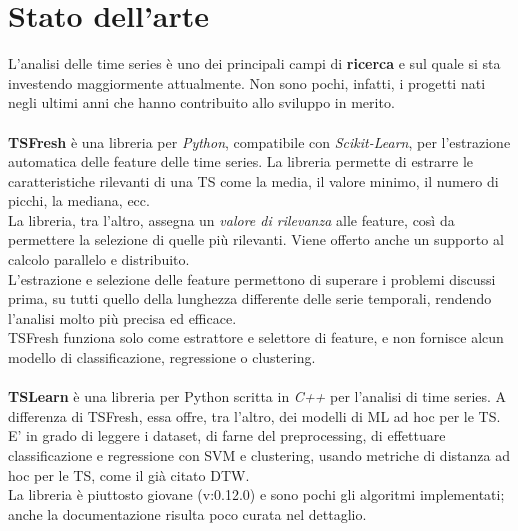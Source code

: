 \section{Stato dell'arte}
L'analisi delle time series è uno dei principali campi di \textbf{ricerca} e sul quale si sta investendo maggiormente attualmente. Non sono pochi, infatti, i progetti nati negli ultimi anni che hanno contribuito allo sviluppo in merito.\\
\\
\textbf{TSFresh}\cite{tsfresh} è una libreria per \textit{Python}, compatibile con \textit{Scikit-Learn}, per l'estrazione automatica delle feature delle time series. La libreria permette di estrarre le caratteristiche rilevanti di una TS come la media, il valore minimo, il numero di picchi, la mediana, ecc.\\
La libreria, tra l'altro, assegna un \textit{valore di rilevanza} alle feature, così da permettere la selezione di quelle più rilevanti. Viene offerto anche un supporto al calcolo parallelo e distribuito.\\
L'estrazione e selezione delle feature permettono di superare i problemi discussi prima, su tutti quello della lunghezza differente delle serie temporali, rendendo l'analisi molto più precisa ed efficace.\\
TSFresh funziona solo come estrattore e selettore di feature, e non fornisce alcun modello di classificazione, regressione o clustering.\\
\\
\textbf{TSLearn}\cite{tslearn} è una libreria per Python scritta in \textit{C++} per l'analisi di time series. A differenza di TSFresh, essa offre, tra l'altro, dei modelli di ML ad hoc per le TS. E' in grado di leggere i dataset, di farne del preprocessing, di effettuare classificazione e regressione con SVM e clustering, usando metriche di distanza ad hoc per le TS, come il già citato DTW.\\
La libreria è piuttosto giovane (v:0.12.0) e sono pochi gli algoritmi implementati; anche la documentazione risulta poco curata nel dettaglio.

